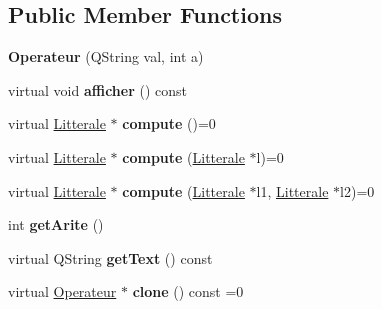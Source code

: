 \subsection*{Public Member Functions}
\begin{DoxyCompactItemize}
\item 
{\bfseries Operateur} (Q\+String val, int a)\hypertarget{class_operateur_ad895d724b42b720a9995af241131e0d9}{}\label{class_operateur_ad895d724b42b720a9995af241131e0d9}

\item 
virtual void {\bfseries afficher} () const \hypertarget{class_operateur_a3099169b08305713cc01fb25a6966919}{}\label{class_operateur_a3099169b08305713cc01fb25a6966919}

\item 
virtual \hyperlink{class_litterale}{Litterale} $\ast$ {\bfseries compute} ()=0\hypertarget{class_operateur_a928858667a7ae2620e8242df28d1834f}{}\label{class_operateur_a928858667a7ae2620e8242df28d1834f}

\item 
virtual \hyperlink{class_litterale}{Litterale} $\ast$ {\bfseries compute} (\hyperlink{class_litterale}{Litterale} $\ast$l)=0\hypertarget{class_operateur_a02731b815ed3b03cec582590d014414a}{}\label{class_operateur_a02731b815ed3b03cec582590d014414a}

\item 
virtual \hyperlink{class_litterale}{Litterale} $\ast$ {\bfseries compute} (\hyperlink{class_litterale}{Litterale} $\ast$l1, \hyperlink{class_litterale}{Litterale} $\ast$l2)=0\hypertarget{class_operateur_a399b64f8edc1bd882c11205b7a734727}{}\label{class_operateur_a399b64f8edc1bd882c11205b7a734727}

\item 
int {\bfseries get\+Arite} ()\hypertarget{class_operateur_af8e33992695ad219093560aaadbaa5ee}{}\label{class_operateur_af8e33992695ad219093560aaadbaa5ee}

\item 
virtual Q\+String {\bfseries get\+Text} () const \hypertarget{class_operateur_a812bdb48e7a4a512cb5921e0a256ae91}{}\label{class_operateur_a812bdb48e7a4a512cb5921e0a256ae91}

\item 
virtual \hyperlink{class_operateur}{Operateur} $\ast$ {\bfseries clone} () const  =0\hypertarget{class_operateur_a10a8157bc85eb2ceaa8e88ff42d0cd9a}{}\label{class_operateur_a10a8157bc85eb2ceaa8e88ff42d0cd9a}

\end{DoxyCompactItemize}
